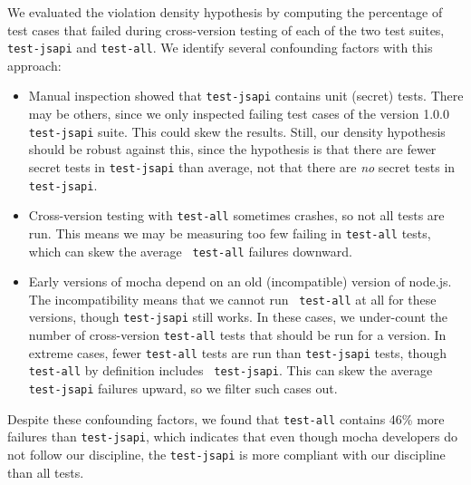 We evaluated the violation density hypothesis by computing the
percentage of test cases that failed during cross-version testing of
each of the two test suites, {\tt test-jsapi} and {\tt test-all}.  We
identify several confounding factors with this approach:
\begin{itemize}
\item Manual inspection showed that {\tt test-jsapi} contains unit
  (secret) tests. There may be others, since we only inspected failing
  test cases of the version 1.0.0 {\tt test-jsapi} suite. This could
  skew the results. Still, our density hypothesis should be robust
  against this, since the hypothesis is that there are fewer secret
  tests in {\tt test-jsapi} than average, not that there are {\em no}
  secret tests in {\tt test-jsapi}.
\item Cross-version testing with {\tt test-all} sometimes crashes, so
  not all tests are run. This means we may be measuring too few
  failing in {\tt test-all} tests, which can skew the average {\tt
    test-all} failures downward.
\item Early versions of mocha depend on an old (incompatible) version
  of node.js. The incompatibility means that we cannot run {\tt
    test-all} at all for these versions, though {\tt test-jsapi} still
  works. In these cases, we under-count the number of cross-version
  {\tt test-all} tests that should be run for a version. In extreme
  cases, fewer {\tt test-all} tests are run than {\tt test-jsapi}
  tests, though {\tt test-all} by definition includes {\tt
    test-jsapi}. This can skew the average {\tt test-jsapi} failures
  upward, so we filter such cases out.
\end{itemize}

Despite these confounding factors, we found that {\tt test-all}
contains 46\% more failures than {\tt test-jsapi}, which indicates
that even though mocha developers do not follow our discipline, the
{\tt test-jsapi} is more compliant with our discipline than all tests.
